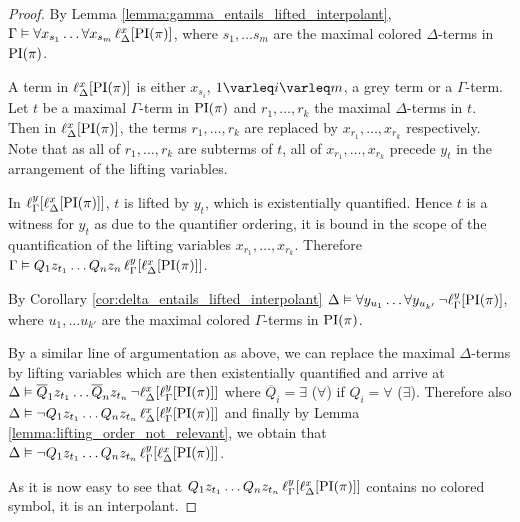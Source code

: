 \begin{proof}
	By Lemma \ref{lemma:gamma_entails_lifted_interpolant}, $\Gamma \entails \forall x_{s_1} \ldots \forall x_{s_m}\,\lifdelta{\PI(\pi)}$, where $s_1, \dots s_m$ are the maximal colored $\Delta$-terms in $\PI(\pi)$.

	A term in $\lifdelta{\PI(\pi)}$ is either $x_{s_i}$, $1 \varleq i \varleq m$, a grey term or a $\Gamma$-term.
	Let $t$ be a maximal $\Gamma$-term in $\PI(\pi)$ and ${r_1}, \dots, {r_k}$ the maximal $\Delta$-terms in\nolinebreak{} $t$.
	Then in $\lifdelta{\PI(\pi)}$, the terms ${r_1}, \dots, {r_k}$ are replaced by $x_{r_1}, \dots, x_{r_k}$ respectively.
	Note that as all of ${r_1}, \dots, {r_k}$ are subterms of $t$, all of $x_{r_1}, \dots, x_{r_k}$ precede $y_t$ in the arrangement of the lifting variables.


	In $\lifgamma{\lifdelta{\PI(\pi)}}$, $t$ is lifted by $y_t$, which is existentially quantified.
	Hence $t$ is a witness for $y_t$ as due to the quantifier ordering,
	it is bound in the scope of the quantification of the lifting variables $x_{r_1}, \dots, x_{r_k}$.
	Therefore $\Gamma \entails Q_1 z_{t_1} \ldots Q_n z_n\,\lifgamma{\lifdelta{\PI(\pi)}}$.

	By Corollary \ref{cor:delta_entails_lifted_interpolant} $\Delta \entails \forall y_{u_1} \dots \forall y_{u_{k'}}\,\lnot \lift{\Gamma}{\PI(\pi)}{y}$, where $u_1, \dots u_{k'}$ are the maximal colored $\Gamma$-terms in $\PI(\pi)$.

	By a similar line of argumentation as above, we can replace the maximal $\Delta$-\nolinebreak{}terms by lifting variables which are then existentially quantified and arrive at
	$\Delta \entails\nolinebreak{} \overline Q_1 z_{t_1} \dots \overline Q_n z_{t_n}\,\lnot \lft{\Delta}{x}{\lft{\Gamma}{y}{\PI(\pi)}}$ where $\overline Q_i = \exists$ ($\forall$) if $Q_i = \forall$ ($\exists$).
	Therefore also
	$\Delta \entails\nolinebreak{} \lnot Q_1 z_{t_1} \dots Q_n z_{t_n}\,\lft{\Delta}{x}{\lft{\Gamma}{y}{\PI(\pi)}}$ and
	finally by Lemma \ref{lemma:lifting_order_not_relevant}, we obtain that 
	$\Delta \entails\nolinebreak{} \lnot Q_1 z_{t_1} \dots Q_n z_{t_n}\,\lft{\Gamma}{y}{\lft{\Delta}{x}{\PI(\pi)}}$.

	As it is now easy to see that $Q_1 z_{t_1} \dots Q_n z_{t_n}\,\lft{\Gamma}{y}{\lft{\Delta}{x}{\PI(\pi)}}$ contains no colored symbol, it is an interpolant.
\end{proof}


